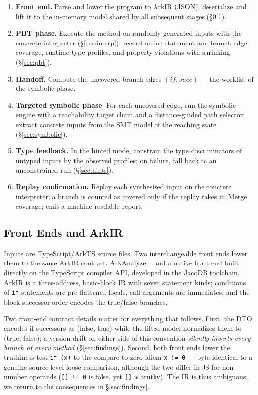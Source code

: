 \documentclass[sigconf,nonacm,screen]{acmart}
\begin{document}
\begin{enumerate}
\item \textbf{Front end.} Parse and lower the program to ArkIR (JSON),
      deserialize and lift it to the in-memory model shared by all
      subsequent stages (\S\ref{sec:frontend}).
\item \textbf{PBT phase.} Execute the method on randomly generated inputs
      with the concrete interpreter (\S\ref{sec:interp}); record online
      statement and branch-edge coverage, runtime type profiles, and
      property violations with shrinking (\S\ref{sec:pbt}).
\item \textbf{Handoff.} Compute the uncovered branch edges
      $(\mathit{if}, \mathit{succ})$ --- the worklist of the symbolic phase.
\item \textbf{Targeted symbolic phase.} For each uncovered edge, run the
      symbolic engine with a reachability target chain and a distance-guided
      path selector; extract concrete inputs from the SMT model of the
      reaching state (\S\ref{sec:symbolic}).
\item \textbf{Type feedback.} In the hinted mode, constrain the type
      discriminators of untyped inputs by the observed profiles; on failure,
      fall back to an unconstrained run (\S\ref{sec:hints}).
\item \textbf{Replay confirmation.} Replay each synthesized input on the
      concrete interpreter; a branch is counted as covered only if the
      replay takes it. Merge coverage; emit a machine-readable report.
\end{enumerate}

\subsection{Front Ends and ArkIR}
\label{sec:frontend}

Inputs are TypeScript/ArkTS source files. Two interchangeable front ends
lower them to the same ArkIR contract: ArkAnalyzer~\cite{arkanalyzer} and a
native front end built directly on the TypeScript compiler API, developed in
the JacoDB toolchain. ArkIR is a three-address, basic-block IR with seven
statement kinds; conditions of \lstinline|if| statements are pre-flattened
locals, call arguments are immediates, and the block successor order encodes
the true/false branches.

Two front-end contract details matter for everything that follows.
First, the DTO encodes if-successors as (false, true) while the lifted model
normalizes them to (true, false); a version drift on either side of this
convention \emph{silently inverts every branch of every method}
(\S\ref{sec:findings}). Second, both front ends lower the truthiness test
\lstinline|if (x)| to the compare-to-zero idiom \lstinline|x != 0| ---
byte-identical to a genuine source-level loose comparison, although the two
differ in JS for non-number operands (\lstinline|[] != 0| is false, yet
\lstinline|[]| is truthy). The IR is thus ambiguous; we return to the
consequences in \S\ref{sec:findings}.
\end{document}
